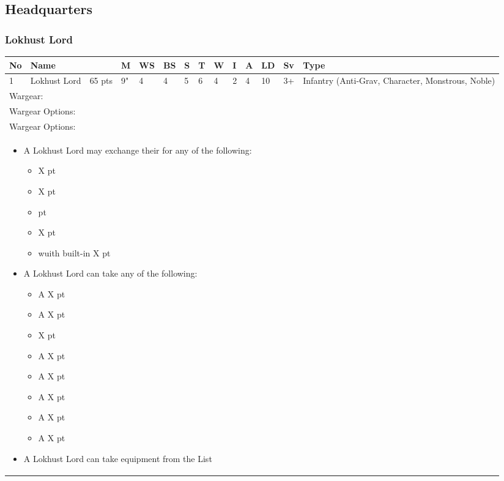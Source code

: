 \newpage
\subsection{Headquarters}

\subsubsection{Lokhust Lord}

\noindent
\begin{tabular}{||m{10pt} m{95pt} m{30pt} m{11pt} m{11pt} m{11pt} m{11pt} m{11pt} m{11pt} m{11pt} m{11pt} m{11pt} m{11pt} m{125pt}||}
	\hline
	No & Name & & M & WS & BS & S & T & W & I & A & LD & Sv & Type \\
	\hline
	1 & Lokhust Lord & 65 pts & 9" & 4 & 4 & 5 & 6 & 4 & 2 & 4 & 10 & 3+ & Infantry (Anti-Grav, Character, Monstrous, Noble)\\
	\hline
	\hline
	\multicolumn{14}{||Z{532 pt}||}{Wargear: \quickref{Staff of Light}}\\
	\multicolumn{14}{||Z{532 pt}||}{Wargear Options:} \\
	\multicolumn{14}{||Z{532 pt}||}{Wargear Options:} \\	
	\multicolumn{14}{||Z{532 pt}||}{\begin{itemize}
			\item A Lokhust Lord may exchange their \quickref{Staff of Light} for any of the following:
			\begin{itemize}
				\item \quickref{Hyperphase Sword} \hrulefill X pt
				\item \quickref{Rod of Night} \hrulefill X pt
				\item \quickref{Voidblade} \hrulefill 0 pt
				\item \quickref{Warscythe} \hrulefill X pt
				\item \quickref{Warscythe} wuith built-in \quickref{Relic Gauss Blaster} \hrulefill X pt
			\end{itemize}
			\item A Lokhust Lord can take any of the following:
			\begin{itemize}
				\item A \quickref{Gauntlet of Fire} \hrulefill X pt
				\item A \quickref{Tachyon Arrow} \hrulefill X pt
				\item \quickref{Mindshackle Scarabs} \hrulefill X pt
				\item A \quickref{Phase Shifter} \hrulefill X pt
				\item A \quickref{Phylactery} \hrulefill X pt
				\item A \quickref{Resurrection Orb} \hrulefill X pt
				\item A \quickref{Sempiternal Weave} \hrulefill X pt
				\item A \quickref{Tesseract Labyrinth} \hrulefill X pt
			\end{itemize}
			\item A Lokhust Lord can take equipment from the \quickref{Artefacts of the Aeons} List
	\end{itemize}} \\		
\end{tabular}

